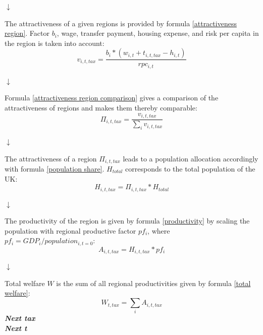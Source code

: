 \documentclass[10pt,a4paper]{article}
\begin{document}
\begin{center}
\begin{center}
    $\downarrow$
\end{center}
The attractiveness of a given regions is provided by formula \ref{attractiveness region}. Factor $b_i$, wage, transfer payment, housing expense, and risk per capita in the region is taken into account: 
\begin{equation}
    v_{i,t,tax} = \frac{b_i*(w_{i,t}+t_{i,t,tax}-h_{i,t})}{rpc_{i,t}}
    \label{attractiveness region}
\end{equation}

\begin{center}
    $\downarrow$
\end{center}
Formula \ref{attractiveness region comparison} gives a comparison of the attractiveness of regions and makes them thereby comparable:
\begin{equation}
    \Pi_{i,t,tax} = \frac{v_{i,t,tax}}{\sum_i v_{i,t,tax}}
    \label{attractiveness region comparison}
\end{equation}

\begin{center}
    $\downarrow$
\end{center}
The attractiveness of a region $\Pi_{i,t,tax}$ leads to a population allocation accordingly with formula \ref{population share}. $H_{total}$ corresponds to the total population of the UK:
\begin{equation}
    H_{i,t,tax} = \Pi_{i,t,tax} * H_{total}
    \label{population share}
\end{equation}

\begin{center}
    $\downarrow$
\end{center}
The productivity of the region is given by formula \ref{productivity} by scaling the population with regional productive factor $pf_i$, where $pf_i = GDP_i / population_{i,t=0}$:
\begin{equation}
    A_{i,t,tax} = H_{i,t,tax} * pf_i
    \label{productivity}
\end{equation}

\begin{center}
    $\downarrow$
\end{center}
Total welfare $W$ is the sum of all regional productivities given by formula \ref{total welfare}:
\begin{equation}
    W_{t,tax} = \sum_i A_{i,t,tax}
    \label{total welfare}
\end{equation}
\vspace{.25cm}
\newline
\textbf{\textit{Next tax}}
\\
\textbf{\textit{Next t}}
\end{center}
\end{document}
